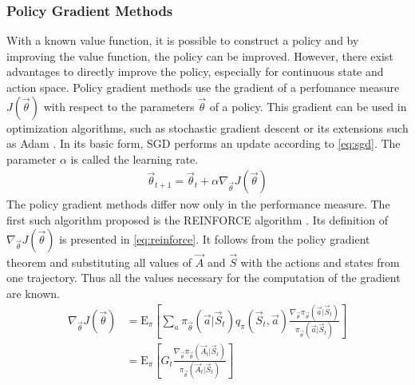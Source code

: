 \subsubsection{Policy Gradient Methods}
With a known value function, it is possible to construct a policy and by improving the value function, the policy can be improved. However, there exist advantages to directly improve the policy, especially for continuous state and action space. Policy gradient methods use the gradient of a perfomance measure $J(\vec{\theta})$ with respect to the parameters $\vec{\theta}$ of a policy. This gradient can be used in optimization algorithms, such as stochastic gradient descent \cite[p. 201]{sutton_reinforcement_2018} or its extensions such as Adam \cite{kingma_adam_2017}. In its basic form, SGD performs an update according to \ref{eq:sgd}. The parameter $\alpha$ is called the learning rate.
\begin{align}
	\vec{\theta}_{t+1} = \vec{\theta}_t + \alpha \nabla_{\vec{\theta}} J(\vec{\theta}) \label{eq:sgd}
\end{align}
The policy gradient methods differ now only in the performance measure. The first such algorithm proposed is the REINFORCE algorithm \cite{williams_simple_1992}. Its definition of $\nabla_{\vec{\theta}} J(\vec{\theta})$ is presented in \eqref{eq:reinforce}. It follows from the policy gradient theorem and substituting all values of $\vec{A}$ and $\vec{S}$ with the actions and states from one trajectory. Thus all the values necessary for the computation of the gradient are known. \cite[p.324-328]{sutton_reinforcement_2018}
\begin{align}
	\nabla_{\vec{\theta}} J(\vec{\theta}) 
	&= \mathrm{E}_\pi \left[ \sum_{a} \pi_{\vec{\theta}} (\vec{a}\vert \vec{S}_t) q_\pi(\vec{S}_t, \vec{a})
	\frac{\nabla_{\vec{\theta}} \pi_{\vec{\theta}}(\vec{a}\vert \vec{S}_t)}{\pi_{\vec{\theta}}(\vec{a}\vert \vec{S}_t)} \right]\label{eq:reinforce} \\
	&= \mathrm{E}_\pi \left[G_t \frac{\nabla_{\vec{\theta}} \pi_{\vec{\theta}}(\vec{A}_t\vert \vec{S}_t)}{\pi_{\vec{\theta}}(\vec{A}_t\vert \vec{S}_t)} \right] \label{eq:reinforce2}
\end{align}
